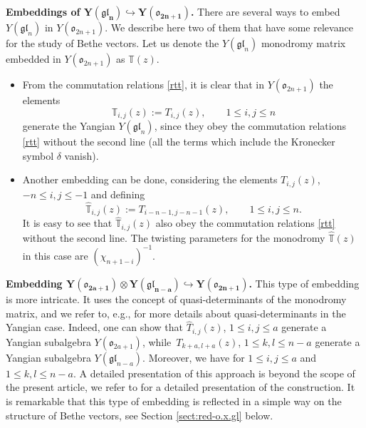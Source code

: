 \documentclass[pdftex]{sigma}
\theoremstyle{definition}
\def\TT{{\mathbb{T}}}
\begin{document}
{\bf Embeddings of $\boldsymbol{Y\!(\mathfrak{gl}_{n})\!\hookrightarrow \!Y(\mathfrak{o}_{2n+1})}$.}
There are several ways to embed $Y(\mathfrak{gl}_{n})$ in $Y(\mathfrak{o}_{2n+1})$. We describe here two of them that have some relevance for the study of Bethe vectors. Let us denote the $Y(\mathfrak{gl}_n)$
monodromy matrix embedded in $Y(\mathfrak{o}_{2n+1})$ as $\TT(z)$.
\begin{itemize}\itemsep=0pt
\item From the commutation relations \eqref{rtt}, it is clear that in $Y(\mathfrak{o}_{2n+1})$ the elements
\begin{equation}\label{Tgl}
\TT_{i,j}(z) := T_{i,j}(z) ,\qquad 1\leq i,j\leq n
\end{equation}
 generate the Yangian $Y(\mathfrak{gl}_{n})$, since they obey the
commutation relations \eqref{rtt} without the second line (all the terms
 which include the Kronecker symbol $\delta$ vanish).


\item
Another embedding can be done, considering the elements $T_{i,j}(z)$, $-n\leq i,j\leq -1$ and defining
\begin{equation}\label{em-sh}
 \hat{\TT}_{i,j}(z) := T_{i - n - 1,j - n -1}(z), \qquad 1\leq i,j\leq n.
\end{equation}
It is easy to see that $\hat{\TT}_{i,j}(z)$ also obey the commutation relations \eqref{rtt} without the second line.
The twisting parameters for the monodromy $\hat{\TT}(z)$ in this case are $(\chi_{n+1-i})^{-1}$.
\end{itemize}


{\bf Embedding $\boldsymbol{Y(\mathfrak{o}_{2a+1})\otimes Y(\mathfrak{gl}_{n-a})
\hookrightarrow Y(\mathfrak{o}_{2n+1})}$.}
This type of embedding is more intricate. It uses the concept of
quasi-determinants \cite{GelfandRetakh}  of the monodromy matrix, and we refer to, e.g., \cite{Molev} for more details about quasi-determinants in the Yangian case.
Indeed, one can show that $\widehat T_{i,j}(z)$, $1\leq i,j\leq a$ generate a Yangian subalgebra $Y(\mathfrak{o}_{2a+1})$,
while~${T_{k+a,l+a}(z)}$, $1\leq k,l\leq n-a$ generate a Yangian subalgebra $Y(\mathfrak{gl}_{n-a})$. Moreover, we have
 for $1\leq i,j\leq a$ and $1\leq k,l\leq n-a$.
A detailed presentation of this approach is beyond the scope of the present article, we
refer to \cite[Theorem 3.7 and Corollary 3.10]{JLM18} for a detailed presentation of the construction.
It is remarkable that this type of embedding
is reflected in a simple way
on the structure of Bethe vectors, see Section \ref{sect:red-o.x.gl} below.
\end{document}

